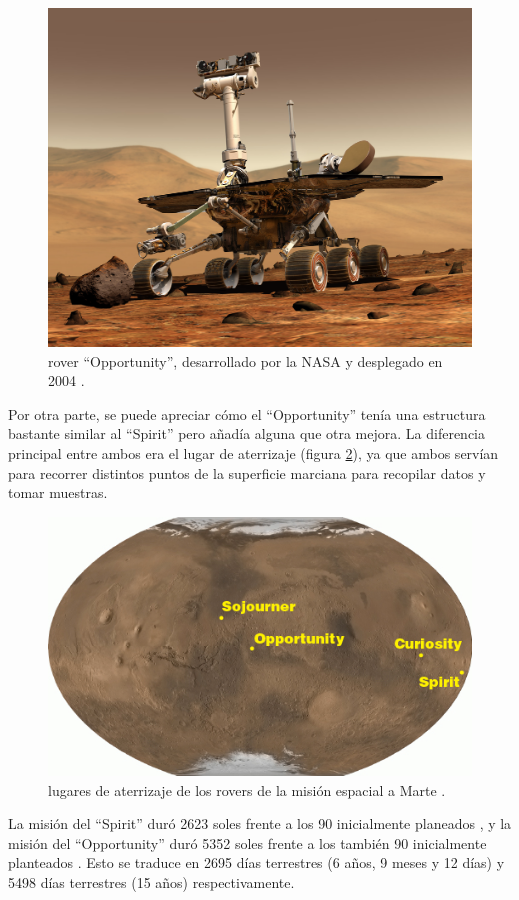 \begin{figure}[H]
    \centering
    \includegraphics[width=.5\linewidth]{pictures/opportunity.jpg}
    \caption{rover ``Opportunity'', desarrollado por la NASA y desplegado en 2004 \cite{noauthor_opportunity_2020}.}
    \label{fig:opportunity}
\end{figure}

Por otra parte, se puede apreciar cómo el ``Opportunity'' tenía una estructura bastante
similar al ``Spirit'' pero añadía alguna que otra mejora. La diferencia principal entre ambos 
era el lugar de aterrizaje (figura \ref{fig:landing_sites}), ya que ambos servían para 
recorrer distintos puntos de la superficie marciana para recopilar datos y tomar muestras.

\begin{figure}[H]
    \centering
    \includegraphics[width=.75\linewidth]{pictures/rover-landing-sites.en.jpg}
    \caption{lugares de aterrizaje de los rovers de la misión espacial a Marte \cite{noauthor_mars_nodate}.}
    \label{fig:landing_sites}
\end{figure}

La misión del ``Spirit'' duró 2623 soles frente a los 90 inicialmente planeados \cite{noauthor_spirit_2020},
y la misión del ``Opportunity'' duró 5352 soles frente a los también 90 inicialmente planteados \cite{noauthor_opportunity_2020}.
Esto se traduce en 2695 días terrestres (6 años, 9 meses y 12 días) y 5498 días terrestres (15 años)
respectivamente.

